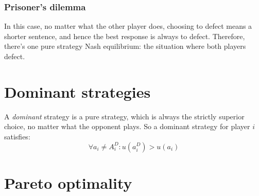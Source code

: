 \documentclass[12pt, a4paper]{article}
\begin{document}
\subsubsection{Prisoner's dilemma}
In this case, no matter what the other player does, choosing to defect means a shorter sentence, and hence the best response is always to defect. Therefore, there's one pure strategy Nash equilibrium: the situation where both players defect.

\section{Dominant strategies}
A \textit{dominant} strategy is a pure strategy, which is always the strictly superior choice, no matter what the opponent plays. So a dominant strategy for player $i$ satisfies:
\begin{equation}
\forall a_i\ne A_i^D: u(a_i^D)> u(a_i)
\end{equation}

\section{Pareto optimality}
\end{document}
